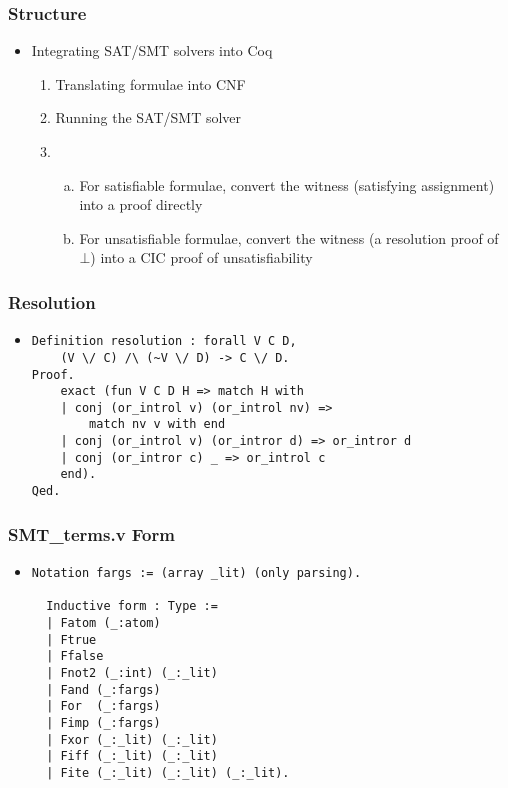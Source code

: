\documentclass{beamer}
\begin{document}
\begin{frame}[fragile]
\frametitle{Structure}
\begin{itemize}
\item
Integrating SAT/SMT solvers into Coq
\begin{enumerate}[1)]
\item Translating formulae into CNF
\item Running the SAT/SMT solver
\item
\begin{enumerate}[a)]
\item
For satisfiable formulae, convert the witness (satisfying assignment) into a proof directly
\item
For unsatisfiable formulae, convert the witness (a resolution proof of $\bot$) into a CIC proof of unsatisfiability
\end{enumerate}
\end{enumerate}
\end{itemize}
\end{frame}

\begin{frame}[fragile]
\frametitle{Resolution}
\begin{itemize}
\item
\begin{Verbatim}[fontsize=\small]
Definition resolution : forall V C D,
    (V \/ C) /\ (~V \/ D) -> C \/ D.
Proof.
    exact (fun V C D H => match H with
    | conj (or_introl v) (or_introl nv) =>
        match nv v with end
    | conj (or_introl v) (or_intror d) => or_intror d
    | conj (or_intror c) _ => or_introl c
    end).
Qed.
\end{Verbatim}
\end{itemize}
\end{frame}

\begin{frame}[fragile]
\frametitle{SMT\_terms.v Form}
\begin{itemize}
\item
\begin{Verbatim}[fontsize=\small]
  Notation fargs := (array _lit) (only parsing).

  Inductive form : Type :=
  | Fatom (_:atom)
  | Ftrue
  | Ffalse
  | Fnot2 (_:int) (_:_lit)
  | Fand (_:fargs)
  | For  (_:fargs)
  | Fimp (_:fargs)
  | Fxor (_:_lit) (_:_lit)
  | Fiff (_:_lit) (_:_lit)
  | Fite (_:_lit) (_:_lit) (_:_lit).
\end{Verbatim}
\end{itemize}
\end{frame}
\end{document}
